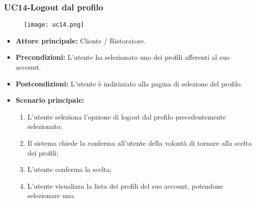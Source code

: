 \subsubsection{UC14-Logout dal profilo}
\begin{figure}[h] \texttt{[image: uc14.png]} \end{figure}
\begin{itemize}
\item \textbf{Attore principale:} Cliente / Ristoratore.
\item \textbf{Precondizioni:} L'utente ha selezionato uno dei profili afferenti al suo account.
\item \textbf{Postcondizioni:} L'utente è indirizzato alla pagina di selezione del profilo.
\item \textbf{Scenario principale:}
\begin{enumerate}
    \item L'utente seleziona l'opzione di logout dal profilo precedentemente selezionato;
    \item Il sistema chiede la conferma all'utente della volontà di tornare alla scelta dei profili;
    \item L'utente conferma la scelta;
    \item L'utente visualizza la lista dei profili del suo account, potendone selezionare uno.
\end{enumerate}
\end{itemize}
